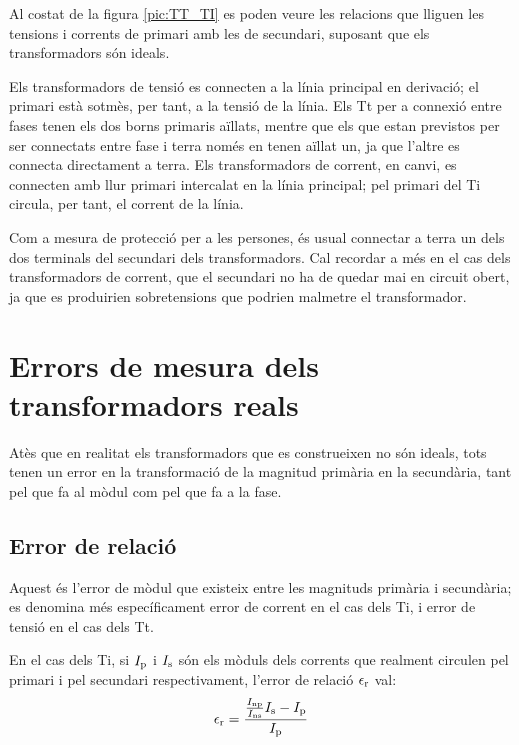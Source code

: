 Al costat de la figura
\vref{pic:TT_TI} es poden veure les relacions que lliguen les
tensions i corrents de primari amb les de secundari, suposant que
els transformadors són ideals.


Els transformadors de tensió es connecten a la línia principal en
derivació; el  primari està sotmès, per tant, a la tensió de la
línia. Els Tt per a connexió entre fases tenen els dos borns
primaris aïllats, mentre que els que estan previstos per ser
connectats entre fase i terra només en tenen aïllat un, ja que
l'altre es connecta directament a terra. Els transformadors de
corrent, en canvi, es connecten amb llur primari intercalat en la
línia principal;  pel primari del Ti circula, per tant, el corrent
 de la línia.

 Com a mesura de protecció per a les persones, és usual
connectar a terra un dels dos terminals del secundari dels
transformadors. Cal recordar a més en el cas dels transformadors de
corrent, que el secundari no ha de quedar mai en circuit obert, ja
que es produirien sobretensions que podrien malmetre el
transformador.

\section{Errors de mesura dels transformadors reals}

Atès que en realitat els transformadors que es construeixen no són
ideals, tots tenen un error en la transformació de la magnitud
primària en la secundària, tant pel que fa al mòdul com pel que fa
a la fase.

\subsection{Error de relació}

Aquest és l'error de mòdul que existeix entre les magnituds primària i
secundària; es denomina més específicament error de corrent en el
cas dels Ti, i error de tensió en el cas dels Tt.

En el cas dels Ti, si $I_\mathrm{p}$ i $I_\mathrm{s}$ són els mòduls dels corrents que
realment circulen pel primari i pel secundari respectivament,
l'error de relació $\epsilon_\mathrm{r}$ val:
\begin{equation}
    \epsilon_\mathrm{r} = \frac{\frac{I_\mathrm{np}}{I_\mathrm{ns}} I_\mathrm{s} - I_\mathrm{p}} {I_\mathrm{p}}
\end{equation}

